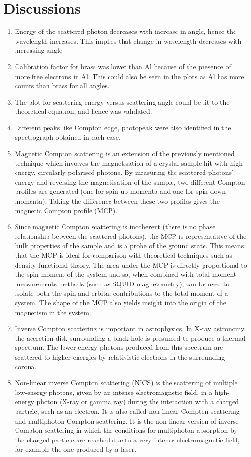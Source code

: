 \documentclass[%
 reprint,
nofootinbib,
 amsmath,amssymb,
 aps,
floatfix,
]{revtex4-2}
\begin{document}
\section{Discussions}
    \begin{enumerate}
        \item Energy of the scattered photon decreases with increase in angle, hence the wavelength increases. This implies that change in wavelength decreases with increasing angle.
        \item Calibration factor for brass was lower than Al because of the presence of more free electrons in Al. This could also be seen in the plots as Al has more counts than brass for all angles.
        \item The plot for scattering energy versus scattering angle could be fit to the theoretical equation, and hence was validated.
        \item Different peaks like Compton edge, photopeak were also identified in the spectrograph obtained in each case.
        \item Magnetic Compton scattering is an extension of the previously mentioned technique which involves the magnetisation of a crystal sample hit with high energy, circularly polarised photons. By measuring the scattered photons' energy and reversing the magnetisation of the sample, two different Compton profiles are generated (one for spin up momenta and one for spin down momenta). Taking the difference between these two profiles gives the magnetic Compton profile (MCP).
        \item Since magnetic Compton scattering is incoherent (there is no phase relationship between the scattered photons), the MCP is representative of the bulk properties of the sample and is a probe of the ground state. This means that the MCP is ideal for comparison with theoretical techniques such as density functional theory. The area under the MCP is directly proportional to the spin moment of the system and so, when combined with total moment measurements methods (such as SQUID magnetometry), can be used to isolate both the spin and orbital contributions to the total moment of a system. The shape of the MCP also yields insight into the origin of the magnetism in the system.
        \item Inverse Compton scattering is important in astrophysics. In X-ray astronomy, the accretion disk surrounding a black hole is presumed to produce a thermal spectrum. The lower energy photons produced from this spectrum are scattered to higher energies by relativistic electrons in the surrounding corona.
        \item Non-linear inverse Compton scattering (NICS) is the scattering of multiple low-energy photons, given by an intense electromagnetic field, in a high-energy photon (X-ray or gamma ray) during the interaction with a charged particle, such as an electron. It is also called non-linear Compton scattering and multiphoton Compton scattering. It is the non-linear version of inverse Compton scattering in which the conditions for multiphoton absorption by the charged particle are reached due to a very intense electromagnetic field, for example the one produced by a laser.
    \end{enumerate}
\end{document}
